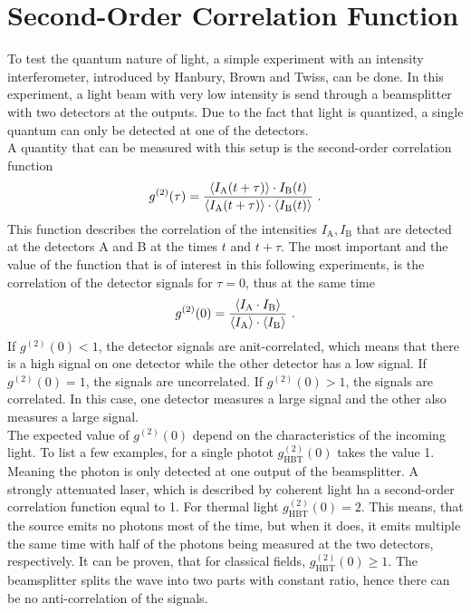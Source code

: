 \section{Second-Order Correlation Function}
To test the quantum nature of light, a simple experiment with an intensity interferometer, introduced by Hanbury, Brown and Twiss, can be done. In this experiment, a light beam with very low intensity is send through a beamsplitter with two detectors at the outputs. Due to the fact that light is quantized, a single quantum can only be detected at one of the detectors. \\
A quantity that can be measured with this setup is the second-order correlation function 
\begin{equation}
    g^{(2)}(\tau)=\frac{\braket{I_\text{A}(t+\tau)} \cdot I_\text{B}(t)}{\braket{I_\text{A}(t+\tau)} \cdot \braket{I_\text{B}(t)}}~.
    \label{eq:Cf}
\end{equation}
This function describes the correlation of the intensities $I_\text{A}, I_\text{B}$ that are detected at the detectors A and B at the times $t$ and $t+\tau$. The most important and the value of the function that is of interest in this following experiments, is the correlation of the detector signals for $\tau=0$, thus at the same time 
\begin{equation}
    g^{(2)}(0)=\frac{\braket{I_\text{A} \cdot I_\text{B}}}{\braket{I_\text{A}} \cdot \braket{I_\text{B}}}~.
\end{equation}
If $g^{(2)}(0)<1$, the detector signals are anit-correlated, which means that there is a high signal on one detector while the other detector  has a low signal. If $g^{(2)}(0)=1$, the signals are uncorrelated. If $g^{(2)}(0)>1$, the signals are correlated. In this case, one detector measures a large signal and the other also measures a large signal. \\
The expected value of $g^{(2)}(0)$ depend on the characteristics of the incoming light. To list a few examples, for a single photot $g_\text{HBT}^{(2)}(0)$ takes the value 1. Meaning the photon is only detected at one output of the beamsplitter. A strongly attenuated laser, which is described by coherent light ha a second-order correlation function equal to 1. For thermal light $g_\text{HBT}^{(2)}(0)=2$. This means, that the source emits no photons most of the time, but when it does, it emits multiple the same time with half of the photons being measured at the two detectors, respectively. It can be proven, that for classical fields, $g_\text{HBT}^{(2)}(0) \geq 1$. The beamsplitter splits the wave into two parts with constant ratio, hence there can be no anti-correlation of the signals.


